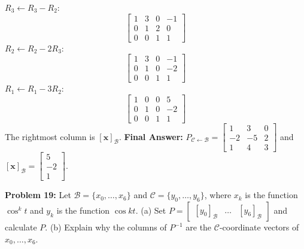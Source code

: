 \documentclass[11pt]{article}
\begin{document}
$R_3 \leftarrow R_3 - R_2$:
\[ \begin{bmatrix} 1 & 3 & 0 & -1 \\ 0 & 1 & 2 & 0 \\ 0 & 0 & 1 & 1 \end{bmatrix} \]
$R_2 \leftarrow R_2 - 2R_3$:
\[ \begin{bmatrix} 1 & 3 & 0 & -1 \\ 0 & 1 & 0 & -2 \\ 0 & 0 & 1 & 1 \end{bmatrix} \]
$R_1 \leftarrow R_1 - 3R_2$:
\[ \begin{bmatrix} 1 & 0 & 0 & 5 \\ 0 & 1 & 0 & -2 \\ 0 & 0 & 1 & 1 \end{bmatrix} \]
The rightmost column is $[\mathbf{x}]_{\mathcal{B}}$.
\textbf{Final Answer:} $P_{\mathcal{C} \leftarrow \mathcal{B}} = \begin{bmatrix} 1 & 3 & 0 \\ -2 & -5 & 2 \\ 1 & 4 & 3 \end{bmatrix}$ and $[\mathbf{x}]_{\mathcal{B}} = \begin{bmatrix} 5 \\ -2 \\ 1 \end{bmatrix}$.

\vspace{0.5cm}

\textbf{Problem 19:} Let $\mathcal{B} = \{x_0, \dots, x_6\}$ and $\mathcal{C} = \{y_0, \dots, y_6\}$, where $x_k$ is the function $\cos^k t$ and $y_k$ is the function $\cos kt$. (a) Set $P = \begin{bmatrix} [y_0]_{\mathcal{B}} & \dots & [y_6]_{\mathcal{B}} \end{bmatrix}$ and calculate $P$. (b) Explain why the columns of $P^{-1}$ are the $\mathcal{C}$-coordinate vectors of $x_0, \dots, x_6$.
\end{document}
